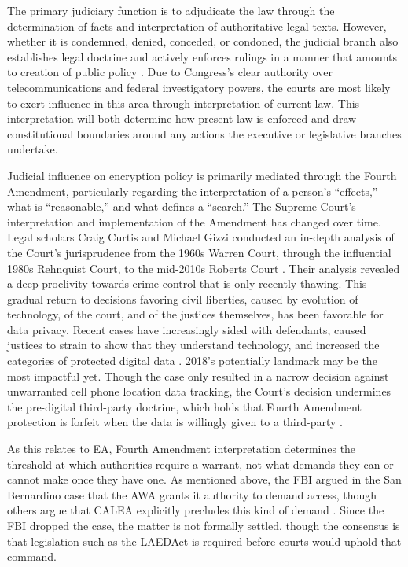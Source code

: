 
The primary judiciary function is to adjudicate the law through the determination of facts and interpretation of
authoritative legal texts. However, whether it is condemned, denied, conceded, or condoned, the judicial branch also
establishes legal doctrine and actively enforces rulings in a manner that amounts to creation of public policy
\cite{feeley_judicial_2000}. Due to Congress's clear authority over telecommunications and federal investigatory powers,
the courts are most likely to exert influence in this area through interpretation of current law. This interpretation
will both determine how present law is enforced and draw constitutional boundaries around any actions the executive or
legislative branches undertake.

Judicial influence on encryption policy is primarily mediated through the Fourth Amendment, particularly regarding the
interpretation of a person's ``effects,'' what is ``reasonable,'' and what defines a ``search.'' The Supreme Court's
interpretation and implementation of the Amendment has changed over time. Legal scholars Craig Curtis and Michael Gizzi
conducted an in-depth analysis of the Court's jurisprudence from the 1960s Warren Court, through the influential 1980s
Rehnquist Court, to the mid-2010s Roberts Court \cite{gizzi_fourth_2016}. Their analysis revealed a deep proclivity
towards crime control that is only recently thawing. This gradual return to decisions favoring civil liberties, caused
by evolution of technology, of the court, and of the justices themselves, has been favorable for data privacy. Recent
cases have increasingly sided with defendants, caused justices to strain to show that they understand technology, and
increased the categories of protected digital data \cite{gizzi_fourth_2016}. 2018's potentially landmark  may be the most impactful yet. Though the case only resulted in a narrow decision against unwarranted
cell phone location data tracking, the Court's decision undermines the pre-digital third-party doctrine, which holds
that Fourth Amendment protection is forfeit when the data is willingly given to a third-party \cite{franklin_2018}.

As this relates to \ac{EA}, Fourth Amendment interpretation determines the threshold at which authorities require a
warrant, not what demands they can or cannot make once they have one. As mentioned above, the FBI argued in the San
Bernardino case that the \ac{AWA} grants it authority to demand access, though others argue that \acs{CALEA} explicitly
precludes this kind of demand \cite{gidari_2016}. Since the FBI dropped the case, the matter is not formally settled,
though the consensus is that legislation such as the \ac{LAEDAct} is required before courts would uphold that command.

